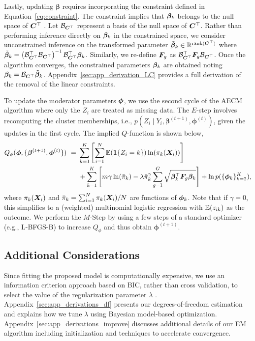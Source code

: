 Lastly, updating $\bm{\beta}$ requires incorporating the constraint
defined in Equation~\eqref{eq:constraint}.  The constraint implies
that $\bm{\beta}_k$ belongs to the null space of $\bm{C}^\top$
\citep{lawson1974linear}. Let $\mathcal{B}_{\bm{C}^\top}$ represent a
basis of the null space of $\bm{C}^\top$. Rather than performing
inference directly on $\bm{\beta}_k$ in the constrained space, we consider
unconstrained inference on the transformed parameter
$\tilde{\bm{\beta}}_k \in \mathbb{R}^{\text{rank}(\bm{C}^\top)}$ where
$\tilde{\bm{\beta}}_k=\left(\mathcal{B}_{\bm{C}^\top}^\top
  \mathcal{B}_{\bm{C}^\top}\right)^{-1}
\mathcal{B}_{\bm{C}^\top}^\top\bm{\beta}_k $.  Similarly, we re-define
$\bm{F}_g$ as $\mathcal{B}_{\bm{C}^\top}^\top \bm{F}_g
\mathcal{B}_{\bm{C}^\top}$. Once the algorithm converges, the constrained
parameters $\bm{\beta}_k$ are obtained noting
$\bm{\beta}_k = \mathcal{B}_{\bm{C}^\top}
\tilde{\bm{\beta}}_k$. Appendix~\ref{sec:app_derivation_LC} provides a
full derivation of the removal of the linear constraints.


To update the moderator parameters $\bm{\phi}$, we use the second cycle of
the AECM algorithm where only the $Z_i$ are treated as missing
data. The $E$-step involves recomputing the cluster memberships, i.e.,
$p(Z_i \mid Y_i, \bm{\beta}^{(t+1)}, \bm{\phi}^{(t)})$, given the updates in the first
cycle. The implied $Q$-function is shown below,
\begin{align}
\label{eq:aecm_qphi}
Q_{\phi}(\bm{\phi}, \{\bm{\beta}^{(t+1)}, \bm{\phi}^{(t)}\}) \ = \
&\sum_{k=1}^K \left[\sum_{i=1}^N \mathbb{E}(\mathbf{1}\{Z_{i} = k\})\ln(\pi_{k}(\bm{X}_i))\right] \nonumber \\
& + \sum_{k=1}^K \left[m \gamma \ln(\bar{\pi}_k) - \lambda \bar{\pi}_k^\gamma \sum_{g=1}^{G} \sqrt{\bm{\beta}_k^\top \bm{F}_{g} \bm{\beta}_k}\right] + \ln p(\{\bm{\phi}_k\}_{k=2}^K),
\end{align}
where $\pi_k(\bm{X}_i)$ and $\bar\pi_k= \sum_{i=1}^N \pi_k(\bm{X}_i)/N$ are
functions of $\bm{\phi}_k$.  Note that if $\gamma = 0$, this simplifies to
a (weighted) multinomial logistic regression with $\mathbb{E}(z_{ik})$ as the
outcome. We perform the $M$-Step by using a few steps of a standard
optimizer (e.g., L-BFGS-B) to increase $Q_{\phi}$ and thus obtain
$\bm{\phi}^{(t+1)}$.


\subsection{Additional Considerations}
\label{sec:additional}

Since fitting the proposed model is computationally expensive, we use
an information criterion approach based on BIC, rather than cross
validation, to select the value of the regularization parameter
$\lambda$
\citep{khal:chen:07,khalili2010mixture,chamroukhi2019regularized}. Appendix~\ref{sec:app_derivations_df}
presents our degrees-of-freedom estimation and explains how we tune
$\lambda$ using Bayesian model-based
optimization. Appendix~\ref{sec:app_derivations_improve} discusses
additional details of our EM algorithm including initialization and
techniques to accelerate convergence.

